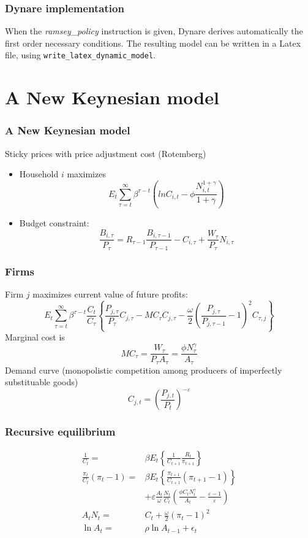 \documentclass{beamer}
\begin{document}
\begin{frame}[fragile]
  \frametitle{Dynare implementation}
When the \emph{ramsey\_policy} instruction is given, Dynare derives
automatically the first order necessary conditions. The resulting
model can be written in a Latex file, using \verb+write_latex_dynamic_model+.
\end{frame}

\section{A New Keynesian model}

\begin{frame}\frametitle{A New Keynesian model}
Sticky prices with price adjustment cost (Rotemberg)\\
\bigskip

\begin{itemize}
\item Household $i$ maximizes
\[
E_t\sum_{\tau=t}^\infty \beta^{\tau-t}\left(ln C_{i,t}-\phi \frac{N_{i,t}^{1+\gamma }}{1+\gamma }\right)
\]
\item Budget constraint:
\[
\frac{B_{i,\tau}}{P_\tau} = R_{\tau-1}\frac{B_{i,\tau-1}}{P_{\tau-1}}-C_{i,\tau}+\frac{W_\tau}{P_\tau}N_{i,\tau}
\]
\end{itemize}

\end{frame}

\begin{frame}
  \frametitle{Firms}
  Firm $j$ maximizes current value of future profits:
\[
E_t\sum_{\tau=t}^\infty\beta^{\tau-t}\frac{C_t}{C_\tau} \left\{\frac{P_{j,\tau}}{P_\tau}C_{j,\tau}-MC_\tau C_{j,\tau}-\frac{\omega}{2}\left(\frac{P_{j,\tau}}{P_{j,\tau-1}}-1\right)^2 C_{\tau,j}\right\}
\]
Marginal cost is
\[
MC_\tau = \frac{W_\tau}{P_\tau A_\tau} = \frac{\phi N_\tau^\gamma}{A_\tau}
\]
Demand curve (monopolistic competition among producers of imperfectly substituable goods)
\[
C_{j,t} = \left(\frac{P_{j,t}}{P_t}\right)^{-\varepsilon}
\]
\end{frame}

\begin{frame}\frametitle{Recursive equilibrium}

\begin{align*}
\frac{1}{C_{t}} =&\beta E_{t}\left \{ \frac{1}{C_{t+1}}\frac{R_{t}}{\pi
_{t+1}}\right \}\\
 \frac{\pi _{t}}{C_{t}}\left( \pi _{t}-1\right)
=&\beta E_{t}\left \{ \frac{\pi _{t+1}}{C_{t+1}}\left( \pi _{t+1}-1\right)
\right \} \\
&+\varepsilon \frac{A_{t}}{\omega }\frac{N_{t}}{C_{t}}\left(
\frac{\phi C_tN_{t}^{\gamma }}{A_{t}}-\frac{\varepsilon -1}{\varepsilon}\right) \\
A_{t}N_{t} =& C_{t}+\frac{\omega }{2}\left( \pi _{t}-1\right) ^{2}\\
\ln A_t =& \rho\ln A_{t-1} + \epsilon_t
\end{align*}
\end{frame}
\end{document}
